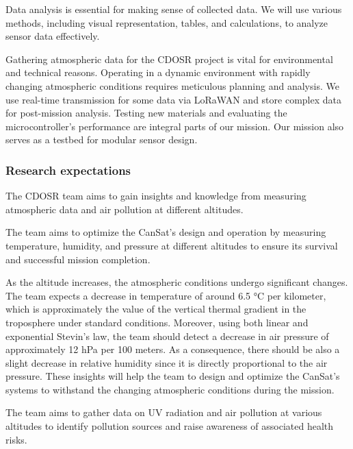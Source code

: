 Data analysis is essential for making sense of collected data. We will use various methods, including visual representation, tables, and calculations, to analyze sensor data effectively.

Gathering atmospheric data for the CDOSR project is vital for environmental and technical reasons. Operating in a dynamic environment with rapidly changing atmospheric conditions requires meticulous planning and analysis. We use real-time transmission for some data via LoRaWAN and store complex data for post-mission analysis. Testing new materials and evaluating the microcontroller's performance are integral parts of our mission. Our mission also serves as a testbed for modular sensor design.

\subsubsection{Research expectations}

The CDOSR team aims to gain insights and knowledge from measuring atmospheric data and air pollution at different altitudes.

The team aims to optimize the CanSat's design and operation by measuring temperature, humidity, and pressure at different altitudes to ensure its survival and successful mission completion.

As the altitude increases, the atmospheric conditions undergo significant changes. The team expects a decrease in temperature of around 6.5 °C per kilometer, which is approximately the value of the vertical thermal gradient in the troposphere under standard conditions. Moreover, using both linear and exponential Stevin's law, 
the team should detect a decrease in air pressure of approximately 12 hPa per 100 meters. As a consequence, there should be also a slight decrease in relative humidity since it is directly proportional to the air pressure. These insights will help the team to design and optimize the CanSat's systems to withstand the changing atmospheric conditions during the mission.


The team aims to gather data on UV radiation and air pollution at various altitudes to identify pollution sources and raise awareness of associated health risks.

